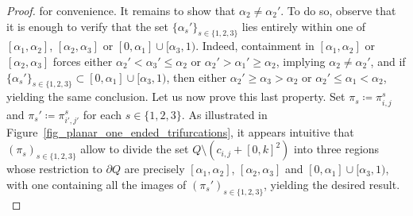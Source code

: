 \documentclass[a4paper, 11pt]{article} %
\theoremstyle{plain}
\newcommand{\1}{\mathds 1}
\numberwithin{equation}{section}
\begin{document}
\begin{proof}
    for convenience. It remains to show that $\alpha_2\neq\alpha_2'$. To do so, observe that it is enough to verify that the set $\{\alpha_s'\}_{s\in\{1,2,3\}}$ lies entirely within one of $[\alpha_1,\alpha_2]$, $[\alpha_2,\alpha_3]$ or $[0,\alpha_1]\cup[\alpha_3,1)$. Indeed, containment in $[\alpha_1,\alpha_2]$ or $[\alpha_2,\alpha_3]$ forces either $\alpha_2'<\alpha_3'\leq \alpha_2$ or $\alpha_2'>\alpha_1'\geq \alpha_2$, implying $\alpha_2\neq \alpha_2'$, and if $\{\alpha_s'\}_{s\in\{1,2,3\}}\subset [0,\alpha_1]\cup[\alpha_3,1)$, then either $\alpha_2'\geq \alpha_3>\alpha_2$ or $\alpha_2'\leq \alpha_1<\alpha_2$, yielding the same conclusion. Let us now prove this last property. Set $\pi_s\coloneqq\pi_{i, j}^s$ and $\pi_s'\coloneqq\pi_{i', j'}^s$ for each $s\in\{1,2,3\}$. As illustrated in Figure~\ref{fig_planar_one_ended_trifurcations}, it appears intuitive that $(\pi_s)_{s\in\{1,2,3\}}$ allow to divide the set $Q\setminus(c_{i, j}+[0,k]^2)$ into three regions whose restriction to $\partial Q$ are precisely $[\alpha_1,\alpha_2]$, $[\alpha_2,\alpha_3]$ and $[0,\alpha_1]\cup[\alpha_3,1)$, with one containing all the images of $(\pi_s')_{s\in\{1,2,3\}}$, yielding the desired result.\\
    

\end{proof}
\end{document}
